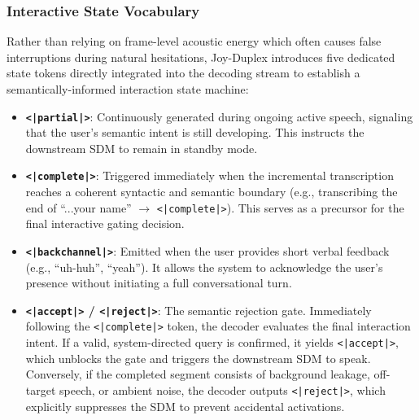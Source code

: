 \subsubsection{Interactive State Vocabulary}
Rather than relying on frame-level acoustic energy which often causes false interruptions during natural hesitations, Joy-Duplex introduces five dedicated state tokens directly integrated into the decoding stream to establish a semantically-informed interaction state machine:
\begin{itemize}
    \item \textbf{\texttt{<|partial|>}}: Continuously generated during ongoing active speech, signaling that the user's semantic intent is still developing. This instructs the downstream SDM to remain in standby mode.
    \item \textbf{\texttt{<|complete|>}}: Triggered immediately when the incremental transcription reaches a coherent syntactic and semantic boundary (e.g., transcribing the end of ``...your name'' $\rightarrow$ \texttt{<|complete|>}). This serves as a precursor for the final interactive gating decision.
    \item \textbf{\texttt{<|backchannel|>}}: Emitted when the user provides short verbal feedback (e.g., ``uh-huh'', ``yeah''). It allows the system to acknowledge the user's presence without initiating a full conversational turn.
    \item \textbf{\texttt{<|accept|>} / \texttt{<|reject|>}}: The semantic rejection gate. Immediately following the \texttt{<|complete|>} token, the decoder evaluates the final interaction intent. If a valid, system-directed query is confirmed, it yields \texttt{<|accept|>}, which unblocks the gate and triggers the downstream SDM to speak. Conversely, if the completed segment consists of background leakage, off-target speech, or ambient noise, the decoder outputs \texttt{<|reject|>}, which explicitly suppresses the SDM to prevent accidental activations.
\end{itemize}